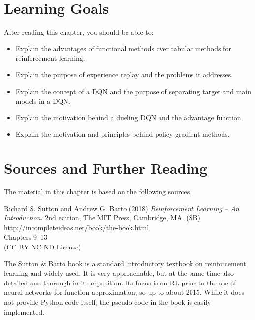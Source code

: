 %
%
\section*{Learning Goals}

After reading this chapter, you should be able to:
\begin{itemize}
    \item Explain the advantages of functional methods over tabular methods for reinforcement learning. 
    \item Explain the purpose of experience replay and the problems it addresses.
    \item Explain the concept of a DQN and the purpose of separating target and main models in a DQN.
    \item Explain the motivation behind a dueling DQN and the advantage function. 
    \item Explain the motivation and principles behind policy gradient methods.
\end{itemize}


\section*{Sources and Further Reading}

The material in this chapter is based on the following sources. 

\begin{tcolorbox}[colback=alert]
Richard S. Sutton and Andrew G. Barto (2018) \emph{Reinforcement Learning -- An Introduction}. 2nd edition, The MIT Press, Cambridge, MA. (SB) \\
\vspace{0.5\baselineskip}
\url{http://incompleteideas.net/book/the-book.html} \\
\vspace{0.5\baselineskip}
Chapters 9--13 \\
\vspace{0.5\baselineskip}
(CC BY-NC-ND License)
\end{tcolorbox}

The Sutton \& Barto book is a standard introductory textbook on reinforcement learning and widely used. It is very approachable, but at the same time also detailed and thorough in its exposition. Its focus is on RL prior to the use of neural networks for function approximation, so up to about 2015. While it does not provide Python code itself, the pseudo-code in the book is easily implemented.


